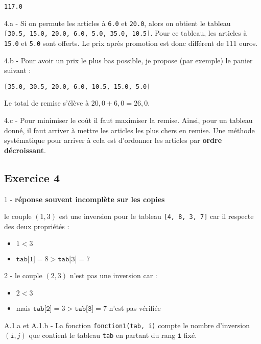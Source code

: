 \documentclass[a4paper,17pt]{extarticle}
\providecommand{\tightlist}{%
      \setlength{\itemsep}{0pt}\setlength{\parskip}{0pt}}
\begin{document}
    \begin{Verbatim}[commandchars=\\\{\}]
117.0
    \end{Verbatim}

    4.a - Si on permute les articles à \texttt{6.0} et \texttt{20.0}, alors
on obtient le tableau
\texttt{{[}30.5,\ 15.0,\ 20.0,\ 6.0,\ 5.0,\ 35.0,\ 10.5{]}}. Pour ce
tableau, les articles à \texttt{15.0} et \texttt{5.0} sont offerts. Le
prix après promotion est donc différent de 111 euros.

    4.b - Pour avoir un prix le plus bas possible, je propose (par exemple)
le panier suivant :

\texttt{{[}35.0,\ 30.5,\ 20.0,\ 6.0,\ 10.5,\ 15.0,\ 5.0{]}}

Le total de remise s'élève à \(20,0 + 6,0 = 26,0\).

    4.c - Pour minimiser le coût il faut maximiser la remise. Ainsi, pour un
tableau donné, il faut arriver à mettre les articles les plus chers en
remise. Une méthode systématique pour arriver à cela est d'ordonner les
articles par \textbf{ordre décroissant}.

    \hypertarget{exercice-4}{%
\subsection{Exercice 4}\label{exercice-4}}

    1 - \textbf{réponse souvent incomplète sur les copies}

le couple \((1,3)\) est une inversion pour le tableau
\texttt{{[}4,\ 8,\ 3,\ 7{]}} car il respecte des deux propriétés :

\begin{itemize}
\tightlist
\item
  \(1 < 3\)
\item
  \(\texttt{tab[1]} = 8 > \texttt{tab[3]} = 7\)
\end{itemize}

    2 - le couple \((2, 3)\) n'est pas une inversion car :

\begin{itemize}
\tightlist
\item
  \(2 < 3\)
\item
  mais \(\texttt{tab[2]} = 3 > \texttt{tab[3]} = 7\) n'est pas vérifiée
\end{itemize}

    A.1.a et A.1.b - La fonction \texttt{fonction1(tab,\ i)} compte le
nombre d'inversion \((\texttt{i}, j)\) que contient le tableau
\texttt{tab} en partant du rang \texttt{i} fixé.
\end{document}
